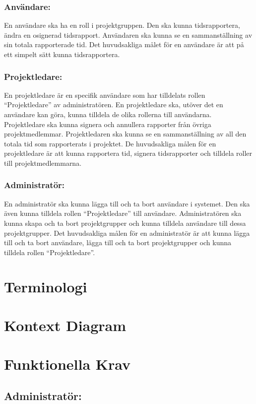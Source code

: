 \documentclass[paper=a4, fontsize=11pt,twoside]{article}
\begin{document}
\subsubsection{Användare:}
En användare ska ha en roll i projektgruppen. Den ska kunna tidsrapportera, ändra en osignerad tidsrapport. Användaren ska kunna se en sammanställning av sin totala rapporterade tid. Det huvudsakliga målet för en användare är att på ett simpelt sätt kunna tidsrapportera.
\subsubsection{Projektledare:}
En projektledare är en specifik användare som har tilldelats rollen “Projektledare” av administratören. En projektledare ska, utöver det en användare kan göra, kunna tilldela de olika rollerna till användarna. Projektledare ska kunna signera och annullera rapporter från övriga projektmedlemmar. Projektledaren ska kunna se en sammanställning av all den totala tid som rapporterats i projektet. De huvudsakliga målen för en projektledare är att kunna rapportera tid, signera tidsrapporter och tilldela roller till projektmedlemmarna. 
\subsubsection{Administratör:}
En administratör ska kunna lägga till och ta bort användare i systemet. Den ska även kunna tilldela rollen “Projektledare” till användare. Administratören ska kunna skapa och ta bort projektgrupper och kunna tilldela användare till dessa projektgrupper. Det huvudsakliga målen för en administratör är att kunna lägga till och ta bort användare, lägga till och ta bort projektgrupper och kunna tilldela rollen “Projektledare”.

\section{Terminologi}
\section{Kontext Diagram}

\section{Funktionella Krav}

\subsection{Administratör:}
\end{document}
